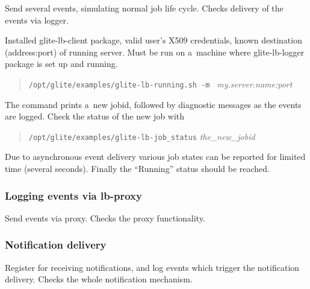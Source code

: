 Send several \LB events, simulating normal job life cycle.
Checks delivery of the events via \LB logger.

\req Installed glite-lb-client package, valid user's X509 credentials,
known destination (address:port) of running \LB server.
Must be run on a~machine where glite-lb-logger package is set up and running.

\how
\begin{quote}
\verb'/opt/glite/examples/glite-lb-running.sh -m ' \emph{my.server.name:port}
\end{quote}

The command prints a~new jobid, followed by diagnostic messages as the events are logged. 
Check the status of the new job with
\begin{quote}
\verb'/opt/glite/examples/glite-lb-job_status' \emph{the\_\/new\_\/jobid}
\end{quote}

\result
Due to asynchronous event
delivery various job states can be reported for limited time (several seconds).
Finally the
``Running'' status should be reached.

\subsubsection{Logging events via lb-proxy}

Send events via \LB proxy. Checks the proxy functionality.

\TODO{}

\subsubsection{Notification delivery}

Register for receiving notifications, and log events which trigger
the notification delivery. Checks the whole notification mechanism.

